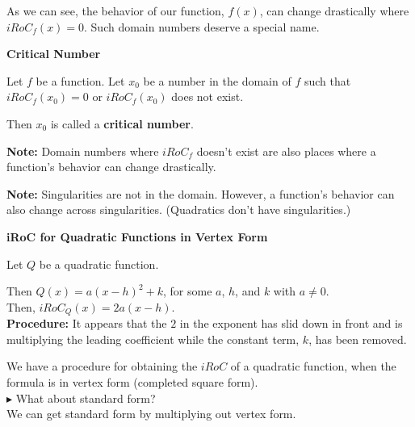 \documentclass{ximera}
\begin{document}
As we can see, the behavior of our function, $f(x)$, can change drastically where $iRoC_f(x) = 0$.  Such domain numbers deserve a special name.



\begin{definition} \textbf{\textcolor{green!50!black}{Critical Number}}  


Let $f$ be a function. Let $x_0$ be a number in the domain of $f$ such that $iRoC_f(x_0) = 0$ or $iRoC_f(x_0)$ does not exist.

Then $x_0$ is called a \textbf{critical number}.


\end{definition}

\textbf{Note: } Domain numbers where $iRoC_f$ doesn't exist are also places where a function's behavior can change drastically.

\textbf{Note: } Singularities are not in the domain. However, a function's behavior can also change across singularities. (Quadratics don't have singularities.)


\begin{procedure} \textbf{\textcolor{blue!75!black}{iRoC for Quadratic Functions in Vertex Form}} 



Let $Q$ be a quadratic function.

Then $Q(x) = a (x - h)^2 + k$, for some $a$, $h$, and $k$ with $a \ne 0$. \\

Then, $iRoC_Q(x) = 2 a (x - h)$. \\


\textbf{Procedure:} It appears that the $2$ in the exponent has slid down in front and is multiplying the leading coefficient while the constant term, $k$, has been removed.



\end{procedure}



We have a procedure for obtaining the $iRoC$ of a quadratic function, when the formula is in vertex form (completed square form). \\

\textbf{\textcolor{blue!55!black}{$\blacktriangleright$}} What about standard form? \\
We can get standard form by multiplying out vertex form. \\
\end{document}
